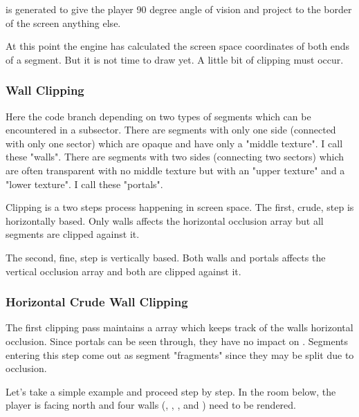 \par
{} is generated to give the player 90 degree angle of vision and project to the border of the screen anything else. 
\par
{}
\par
At this point the engine has calculated the screen space  coordinates of both ends of a segment. But it is not time to draw yet. A little bit of clipping must occur. 






\subsubsection{Wall Clipping}
Here the code branch depending on two types of segments which can be encountered in a subsector. There are segments with only one side (connected with only one sector) which are opaque and have only a "middle texture". I call these "walls". There are segments with two sides (connecting two sectors) which are often transparent with no middle texture but with an "upper texture" and a "lower texture". I call these "portals".\\
\par
Clipping is a two steps process happening in screen space. The first, crude, step is horizontally based. Only walls affects the horizontal occlusion array but all segments are clipped against it.\\
\par
The second, fine, step is vertically based. Both walls and portals affects the vertical occlusion array and both are clipped against it.\\
\par
\pagebreak









\subsubsection{Horizontal Crude Wall Clipping}
The first clipping pass maintains a  array which keeps track of the walls horizontal occlusion. Since portals can be seen through, they have no impact on . Segments entering this step come out as segment "fragments" since they may be split due to occlusion.\\
\par
{}
\par
Let's take a simple example and proceed step by step. In the room below, the player is facing north and four walls (, , , and ) need to be rendered.\\
\par
{}
\par

